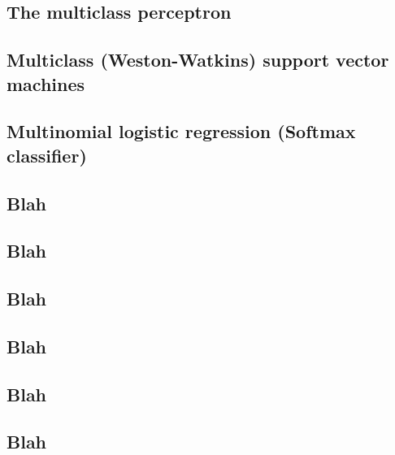 \subsection{The multiclass perceptron}
\subsection{Multiclass (Weston-Watkins) support vector machines}
\subsection{Multinomial logistic regression (Softmax classifier)}
\subsection{Blah}
\subsection{Blah}
\subsection{Blah}
\subsection{Blah}
\subsection{Blah}
\subsection{Blah}

